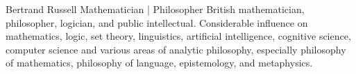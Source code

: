 \documentclass[11pt, a4paper]{notunprofessional}
\begin{document}
\nupprofile
  {Bertrand Russell}
  {Mathematician | Philosopher}
  {British mathematician, philosopher, logician, and public intellectual.
  Considerable influence on mathematics, logic, set theory, linguistics,
  artificial intelligence, cognitive science, computer science and various
  areas of analytic philosophy, especially philosophy of mathematics,
  philosophy of language, epistemology, and metaphysics.}

\makecv
\end{document}
